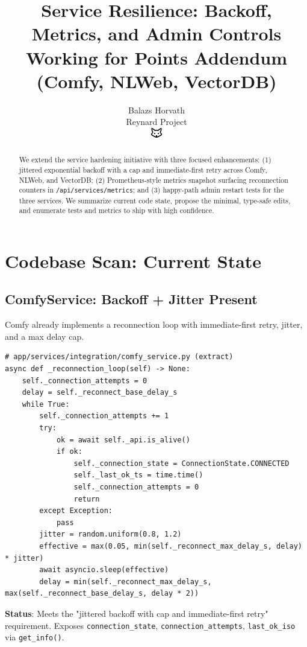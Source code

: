 \documentclass[11pt]{article}
\title{\textbf{Service Resilience: Backoff, Metrics, and Admin Controls}\\
\Large Working for Points Addendum (Comfy, NLWeb, VectorDB)}
\author{Balazs Horvath\\Reynard Project\\\includegraphics[width=0.5cm]{../../shared-assets/favicon.pdf}}
\begin{document}
\maketitle

\begin{abstract}
We extend the service hardening initiative with three focused enhancements: (1) jittered exponential backoff with a cap and immediate-first retry across Comfy, NLWeb, and VectorDB; (2) Prometheus-style metrics snapshot surfacing reconnection counters in \texttt{/api/services/metrics}; and (3) happy-path admin restart tests for the three services. We summarize current code state, propose the minimal, type-safe edits, and enumerate tests and metrics to ship with high confidence.
\end{abstract}

\tableofcontents
\newpage

\section{Codebase Scan: Current State}

\subsection{ComfyService: Backoff + Jitter Present}
Comfy already implements a reconnection loop with immediate-first retry, jitter, and a max delay cap.

\begin{verbatim}
# app/services/integration/comfy_service.py (extract)
async def _reconnection_loop(self) -> None:
    self._connection_attempts = 0
    delay = self._reconnect_base_delay_s
    while True:
        self._connection_attempts += 1
        try:
            ok = await self._api.is_alive()
            if ok:
                self._connection_state = ConnectionState.CONNECTED
                self._last_ok_ts = time.time()
                self._connection_attempts = 0
                return
        except Exception:
            pass
        jitter = random.uniform(0.8, 1.2)
        effective = max(0.05, min(self._reconnect_max_delay_s, delay) * jitter)
        await asyncio.sleep(effective)
        delay = min(self._reconnect_max_delay_s, max(self._reconnect_base_delay_s, delay * 2))
\end{verbatim}

\textbf{Status}: Meets the "jittered backoff with cap and immediate-first retry" requirement. Exposes \texttt{connection\_state}, \texttt{connection\_attempts}, \texttt{last\_ok\_iso} via \texttt{get\_info()}.
\end{document}
